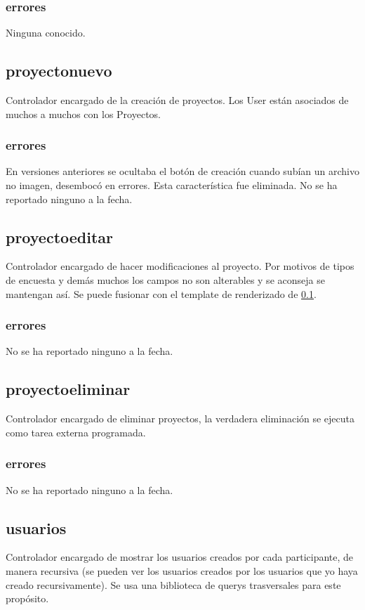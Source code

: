 \documentclass[10pt,a4paper]{book}
\begin{document}
	\subsubsection{errores}
	Ninguna conocido.
	
	
	\subsection{proyectonuevo}\label{proyectonuevo}
	Controlador encargado de la creación de proyectos. Los User están asociados de muchos a muchos con los Proyectos.
	\subsubsection{errores}
	En versiones anteriores se ocultaba el botón de creación cuando subían un archivo no imagen, desembocó en errores. Esta característica fue eliminada. No se ha reportado ninguno a la fecha.
	
	\subsection{proyectoeditar}
	Controlador encargado de hacer modificaciones al proyecto. Por motivos de tipos de encuesta y demás muchos los campos no son alterables y se aconseja se mantengan así. Se puede fusionar con el template de renderizado de \ref{proyectonuevo}.
	\subsubsection{errores}
	No se ha reportado ninguno a la fecha.
	
	\subsection{proyectoeliminar}
	Controlador encargado de eliminar proyectos, la verdadera eliminación se ejecuta como tarea externa programada.
	\subsubsection{errores}
	No se ha reportado ninguno a la fecha.
	
	\subsection{usuarios}
	Controlador encargado de mostrar los usuarios creados por cada participante, de manera recursiva (se pueden ver los usuarios creados por los usuarios que yo haya creado recursivamente). Se usa una biblioteca de querys trasversales para este propósito.
\end{document}
